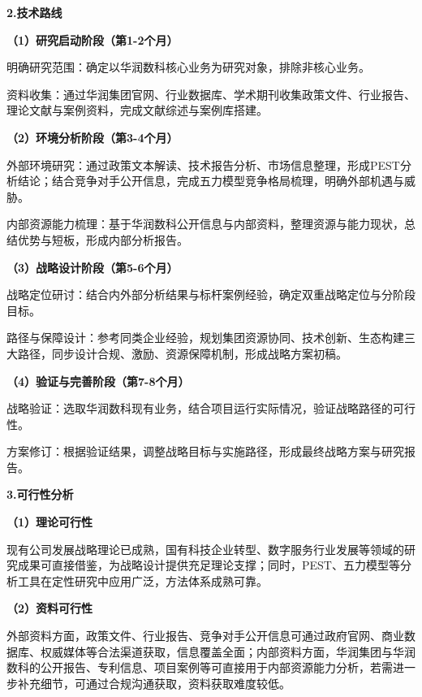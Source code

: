 \documentclass[UTF8, a4paper, 11pt]{ctexart}
\begin{document}
\begin{UnifiedBox}
\vspace{0.3cm}
\noindent \textbf{2.技术路线}

\vspace{0.2cm}
\noindent \textbf{（1）研究启动阶段（第1-2个月）}

明确研究范围：确定以华润数科核心业务为研究对象，排除非核心业务。

资料收集：通过华润集团官网、行业数据库、学术期刊收集政策文件、行业报告、理论文献与案例资料，完成文献综述与案例库搭建。

\vspace{0.2cm}
\noindent \textbf{（2）环境分析阶段（第3-4个月）}

外部环境研究：通过政策文本解读、技术报告分析、市场信息整理，形成PEST分析结论；结合竞争对手公开信息，完成五力模型竞争格局梳理，明确外部机遇与威胁。

内部资源能力梳理：基于华润数科公开信息与内部资料，整理资源与能力现状，总结优势与短板，形成内部分析报告。

\vspace{0.2cm}
\noindent \textbf{（3）战略设计阶段（第5-6个月）}

战略定位研讨：结合内外部分析结果与标杆案例经验，确定双重战略定位与分阶段目标。

路径与保障设计：参考同类企业经验，规划集团资源协同、技术创新、生态构建三大路径，同步设计合规、激励、资源保障机制，形成战略方案初稿。

\vspace{0.2cm}
\noindent \textbf{（4）验证与完善阶段（第7-8个月）}

战略验证：选取华润数科现有业务，结合项目运行实际情况，验证战略路径的可行性。

方案修订：根据验证结果，调整战略目标与实施路径，形成最终战略方案与研究报告。

\vspace{0.3cm}
\noindent \textbf{3.可行性分析}

\vspace{0.2cm}
\noindent \textbf{（1）理论可行性}

现有公司发展战略理论已成熟，国有科技企业转型、数字服务行业发展等领域的研究成果可直接借鉴，为战略设计提供充足理论支撑；同时，PEST、五力模型等分析工具在定性研究中应用广泛，方法体系成熟可靠。

\vspace{0.2cm}
\noindent \textbf{（2）资料可行性}

外部资料方面，政策文件、行业报告、竞争对手公开信息可通过政府官网、商业数据库、权威媒体等合法渠道获取，信息覆盖全面；内部资料方面，华润集团与华润数科的公开报告、专利信息、项目案例等可直接用于内部资源能力分析，若需进一步补充细节，可通过合规沟通获取，资料获取难度较低。


\end{UnifiedBox}
\end{document}
